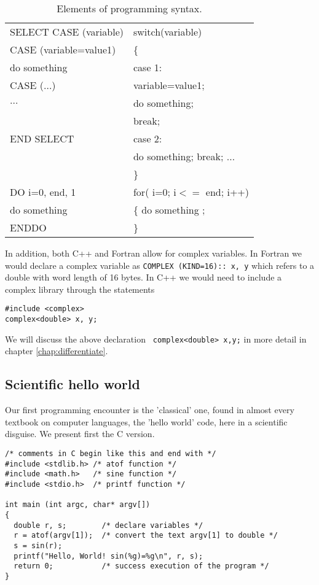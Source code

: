 \begin{table}[hbtp]
\begin{tabular}{ll}
SELECT CASE (variable) &      switch(variable)\\
CASE (variable=value1)&       \{ \\
do something             &     case 1: \\
CASE ($\dots$)          & variable=value1;\\
$\dots$  &              do something; \\
&                       break;\\
END SELECT               & case 2:\\
&                       do something; break; $\dots$\\
&                       \}\\ \hline
DO i=0, end, 1  &      for( i=0; i$<=$ end; i++)\\
do something  &        \{ do something ; \\
ENDDO  &               \}\\\hline\hline
\hline\end{tabular}\caption{Elements of programming syntax.}\end{table}

In addition, both C++ and Fortran  allow for complex variables.
In Fortran  we would declare a complex variable as
{\tt COMPLEX (KIND=16):: x, y} which refers to a double with
word length of 16 bytes. In C++ we would need to include a complex
library through the statements

\begin{lstlisting}
#include <complex>
complex<double> x, y;
\end{lstlisting}
We will discuss the above declaration \verb? complex<double> x,y;? in
more detail in chapter \ref{chap:differentiate}. 

\subsection{Scientific hello world}
Our first  programming encounter is the 'classical' one, found in almost every
textbook on computer languages, the 'hello world' code, here in a scientific disguise. 
We present first the C version.
\begin{lstlisting}[title={\href{{https://github.com/CompPhysics/CompPhysBook1/tree/master/doc/Programs/Chapter2/cpp/program1.cpp}}{Click here to view code}}]
/* comments in C begin like this and end with */
#include <stdlib.h> /* atof function */
#include <math.h>   /* sine function */
#include <stdio.h>  /* printf function */

int main (int argc, char* argv[])
{
  double r, s;        /* declare variables */
  r = atof(argv[1]);  /* convert the text argv[1] to double */
  s = sin(r);
  printf("Hello, World! sin(%g)=%g\n", r, s);
  return 0;           /* success execution of the program */
}
\end{lstlisting}

